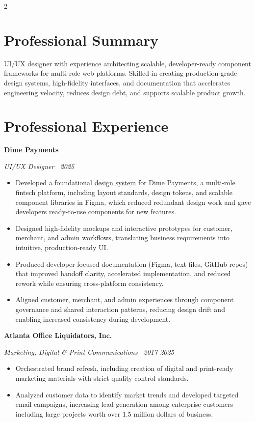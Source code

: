 \documentclass[10pt,letterpaper]{article}
\newcommand{\jobtitle}[3]{%
  {\sffamily\bfseries #1}\par\vspace{-0.4em}
  {\small\color{accent}\itshape #2 \textbar\ #3}\par\vspace{0.2em}
}
\begin{document}
\begin{paracol}{2}
\section{Professional Summary}
UI/UX designer with experience architecting scalable, developer-ready component frameworks for multi-role web platforms. Skilled in creating production-grade design systems, high-fidelity interfaces, and documentation that accelerates engineering velocity, reduces design debt, and supports scalable product growth.

\section{Professional Experience}
\jobtitle{Dime Payments}{UI/UX Designer}{2025}
\begin{itemize}[leftmargin=1.5em, itemsep=0.2em, parsep=0em, topsep=0em]
  \item Developed a foundational \href{https://www.figma.com/design/QaE6JEJ1vNFc1Y8XOrcogl/Dime-Payment-Design-System?m=auto&t=ZEBJ9t8beEsmTjA9-1}{design system} for Dime Payments, a multi-role fintech platform, including layout standards, design tokens, and scalable component libraries in Figma, which reduced redundant design work and gave developers ready-to-use components for new features.
  \item Designed high-fidelity mockups and interactive prototypes for customer, merchant, and admin workflows, translating business requirements into intuitive, production-ready UI.
  \item Produced developer-focused documentation (Figma, text files, GitHub repos) that improved handoff clarity, accelerated implementation, and reduced rework while ensuring cross-platform consistency.
  \item Aligned customer, merchant, and admin experiences through component governance and shared interaction patterns, reducing design drift and enabling increased consistency during development.
\end{itemize}
\vspace{0.5em}
\jobtitle{Atlanta Office Liquidators, Inc.}{Marketing, Digital \& Print Communications}{2017-2025}
\begin{itemize}[leftmargin=1.5em, itemsep=0.2em, parsep=0em, topsep=0em]
  \item Orchestrated brand refresh, including creation of digital and print-ready marketing materials with strict quality control standards.
  \item Analyzed customer data to identify market trends and developed targeted email campaigns, increasing lead generation among enterprise customers including large projects worth over 1.5 million dollars of business.

\end{itemize}
\end{paracol}
\end{document}

